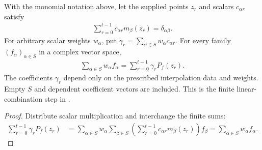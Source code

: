 \begin{theorem}
    \label{thm:fixed_weighted_monomial_recovery}
    \leanok
    With the monomial notation above, let the supplied points $z_r$
    and scalars $c_{\alpha r}$ satisfy
    \begin{align*}
        \sum_{r=0}^{t-1}c_{\alpha r}m_\beta(z_r)=\delta_{\alpha\beta}.
    \end{align*}
    For arbitrary scalar weights $w_\alpha$, put
    $\gamma_r=\sum_{\alpha\in S}w_\alpha c_{\alpha r}$.
    For every family $(f_\alpha)_{\alpha\in S}$ in a complex vector space,
    \begin{align*}
        \sum_{\alpha\in S}w_\alpha f_\alpha
        =\sum_{r=0}^{t-1}\gamma_r P_f(z_r).
    \end{align*}
    The coefficients $\gamma_r$ depend only on the prescribed interpolation
    data and weights. Empty $S$ and dependent coefficient vectors
    are included. This is the finite linear-combination step in
    \cite[Lemma~4.2]{Arad2013AreaLaw}.
\end{theorem}
\begin{proof}\leanok
    Distribute scalar multiplication and interchange the finite sums:
    \begin{align*}
        \sum_{r=0}^{t-1}\gamma_r P_f(z_r)
         & =\sum_{\alpha\in S}w_\alpha
        \sum_{\beta\in S}\left(\sum_{r=0}^{t-1}
        c_{\alpha r}m_\beta(z_r)\right)f_\beta
        =\sum_{\alpha\in S}w_\alpha f_\alpha.
    \end{align*}
\end{proof}

